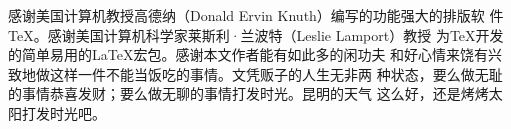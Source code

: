 \begin{Thanks} %
  感谢美国计算机教授高德纳（Donald Ervin Knuth）编写的功能强大的排版软
  件\TeX{}。感谢美国计算机科学家莱斯利·兰波特（Leslie Lamport）教授
  为\TeX{}开发的简单易用的\LaTeX{}宏包。感谢本文作者能有如此多的闲功夫
  和好心情来饶有兴致地做这样一件不能当饭吃的事情。文凭贩子的人生无非两
  种状态，要么做无耻的事情恭喜发财；要么做无聊的事情打发时光。昆明的天气
  这么好，还是烤烤太阳打发时光吧。
\end{Thanks}


